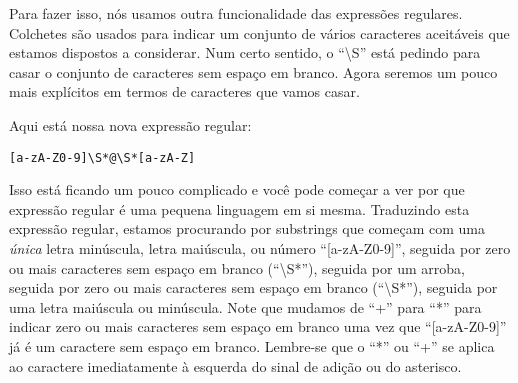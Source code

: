 Para fazer isso, nós usamos outra funcionalidade das expressões regulares.
Colchetes são usados para indicar um conjunto de vários caracteres aceitáveis
que estamos dispostos a considerar. Num certo sentido, o ``{\textbackslash}S''
está pedindo para casar o conjunto de caracteres sem espaço em branco. Agora
seremos um pouco mais explícitos em termos de caracteres que vamos casar.

Aqui está nossa nova expressão regular:

\beforeverb
\begin{verbatim}
[a-zA-Z0-9]\S*@\S*[a-zA-Z]
\end{verbatim}
\afterverb
%

Isso está ficando um pouco complicado e você pode começar a ver por que
expressão regular é uma pequena linguagem em si mesma. Traduzindo esta
expressão regular, estamos procurando por substrings que começam com uma
{\em única} letra minúscula, letra maiúscula, ou número ``[a-zA-Z0-9]'',
seguida por zero ou mais caracteres sem espaço em branco
(``{\textbackslash}S*''), seguida por um arroba, seguida por zero ou mais
caracteres sem espaço em branco (``{\textbackslash}S*''), seguida por uma
letra maiúscula ou minúscula. Note que mudamos de ``+'' para ``*'' para
indicar zero ou mais caracteres sem espaço em branco uma vez que ``[a-zA-Z0-9]''
já é um caractere sem espaço em branco. Lembre-se que o ``*'' ou ``+'' se
aplica ao caractere imediatamente à esquerda do sinal de adição ou do asterisco.

